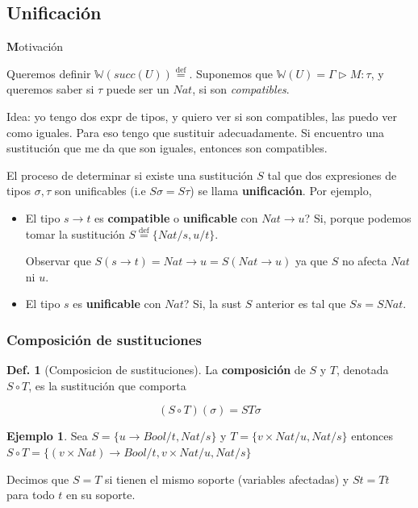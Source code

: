 \documentclass{report}
\theoremstyle{definition} %
\newtheorem{definition}{Def.}[chapter]
\newtheorem{example}{Ejemplo}[chapter]
\newenvironment{nota}[1]
    {\begin{leftbar}\textbf{#1}}
    {\end{leftbar}}
\newcommand{\eqdef}{\overset{\text{def}}{=}}
\newcommand{\tfunc}[2]{#1 \to #2}
\newcommand{\tipa}[3]{#1 \rhd #2 : #3} %
\newcommand{\Gtipa}[2]{\tipa{\Gamma}{#1}{#2}}
\newcommand{\suc}[1]{succ(#1)}
\newcommand{\tsust}[1]{S#1} %
\newcommand{\sustfor}[2]{#1/#2} %
\newcommand{\infer}[1]{\mathbb{W}(#1)}
\newcommand{\comp}[2]{#1 \circ #2}
\begin{document}
\subsection{Unificación}\label{sec:funcional:inferencia:unificacion}

\begin{nota}
    Motivación

    Queremos definir $\infer{\suc{U}} \eqdef$. Suponemos que $\infer{U} =
    \Gtipa{M}{\tau}$, y queremos saber si $\tau$ puede ser un $Nat$, si son
    \textit{compatibles}.
    
    Idea: yo tengo dos expr de tipos, y quiero ver si son compatibles, las puedo
    ver como iguales. Para eso tengo que sustituir adecuadamente. Si encuentro
    una sustitución que me da que son iguales, entonces son compatibles.
\end{nota}

El proceso de determinar si existe una sustitución $S$ tal que dos expresiones
de tipos $\sigma, \tau$ son unificables (i.e $\tsust{\sigma} =
\tsust{\tau}$) se llama \textbf{unificación}. Por ejemplo,

\begin{itemize}
    \item El tipo $\tfunc{s}{t}$ es \textbf{compatible} o \textbf{unificable}
    con $\tfunc{Nat}{u}$? Si, porque podemos tomar la sustitución $S \eqdef \{
    Nat / s, u / t \}$.

    Observar que
    \(
        \tsust{(\tfunc{s}{t})}
        = \tfunc{Nat}{u}
        = \tsust{(\tfunc{Nat}{u})}
    \)
    ya que $S$ no afecta $Nat$ ni $u$.

    \item El tipo $s$ es \textbf{unificable} con $Nat$? Si, la sust $S$ anterior
    es tal que $\tsust{s} = \tsust{Nat}$.
\end{itemize}

\subsubsection{Composición de sustituciones}
\label{sec:func:inferencia:unif:comp}

\begin{definition}[Composicion de sustituciones]
    La \textbf{composición} de $S$ y $T$, denotada $\comp{S}{T}$, es la sustitución que
    comporta

    \[
        (\comp{S}{T})(\sigma) = \tsust{T \sigma}
    \]

    \begin{example}
        Sea $S = \{ \sustfor{\tfunc{u}{Bool}}{t}, \sustfor{Nat}{s} \}$ y $T = \{
        \sustfor{v \times Nat}{u}, \sustfor{Nat}{s} \}$ entonces $\comp{S}{T} =
        \{ \sustfor{\tfunc{(v \times Nat)}{Bool}}{t}, \sustfor{v \times Nat}{u},
            \sustfor{Nat}{s}
        \}$
    \end{example}

    Decimos que $S = T$ si tienen el mismo soporte (variables afectadas) y $St =
    Tt$ para todo $t$ en su soporte.
\end{definition}
\end{document}
